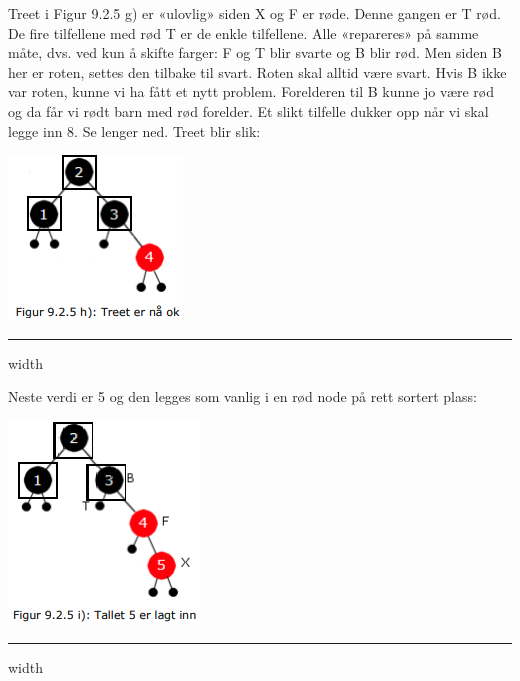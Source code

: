 \documentclass[11pt]{article}
\begin{document}
        \begin{multicols}{2}
            Treet i Figur 9.2.5 g) er «ulovlig» siden X og F er røde. Denne gangen er T rød. De fire
            tilfellene med rød T er de enkle tilfellene. Alle «repareres» på samme måte, dvs. ved kun å
            skifte farger: F og T blir svarte og B blir rød. Men siden B her er roten, settes den tilbake til
            svart. Roten skal alltid være svart. Hvis B ikke var roten, kunne vi ha fått et nytt problem.
            Forelderen til B kunne jo være rød og da får vi rødt barn med rød forelder. Et slikt tilfelle
            dukker opp når vi skal legge inn 8. Se lenger ned. Treet blir slik:

            \columnbreak
            \includegraphics[center]{f-9.2.5h.png}
        \end{multicols}

        \hrule width \textwidth

        \begin{multicols}{2}
            Neste verdi er 5 og den legges som vanlig i en rød node på rett sortert plass:

            \columnbreak
            \includegraphics[center]{f-9.2.5i.png}


        \end{multicols}

        \hrule width \textwidth
\end{document}
